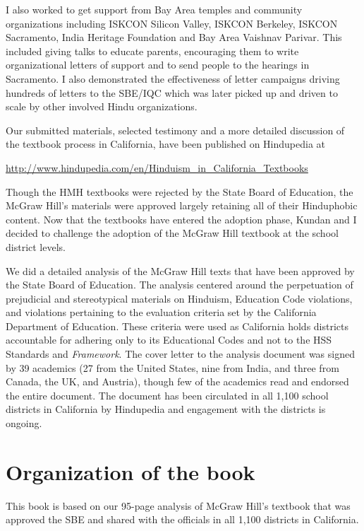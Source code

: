 I also worked to get support from Bay Area temples and community organizations including ISKCON Silicon Valley, ISKCON Berkeley, ISKCON Sacramento, India Heritage Foundation and Bay Area Vaishnav Parivar. This included giving talks to educate parents, encouraging them to write organizational letters of support and to send people to the hearings in Sacramento. I also demonstrated the effectiveness of letter campaigns driving hundreds of letters to the SBE/IQC which was later picked up and driven to scale by other involved Hindu organizations.

Our submitted materials, selected testimony and a more detailed discussion of the textbook process in California, have been published on Hindupedia at 

{\small\url{http://www.hindupedia.com/en/Hinduism_in_California_Textbooks}}

Though the HMH textbooks were rejected by the State Board of Education, the McGraw Hill’s materials were approved largely retaining all of their Hinduphobic content. Now that the textbooks have entered the adoption phase, Kundan and I decided to challenge the adoption of the McGraw Hill textbook at the school district levels. 

We did a detailed analysis of the McGraw Hill texts that have been approved by the State Board of Education. The analysis centered around the perpetuation of prejudicial and stereotypical materials on Hinduism, Education Code violations, and violations pertaining to the evaluation criteria set by the California Department of Education. These criteria were used as California holds districts accountable for adhering only to its Educational Codes and not to the HSS Standards and \textit{Framework}. The cover letter to the analysis document was signed by 39 academics (27 from the United States, nine from India, and three from Canada, the UK, and Austria), though  few of the academics read and endorsed the entire document. The document has been circulated in all 1,100 school districts in California by Hindupedia and engagement with the districts is ongoing.

\section*{Organization of the book}
\vskip -5pt

This book is based on our 95-page analysis of McGraw Hill’s textbook that was approved the SBE and shared with the officials in all 1,100 districts in California. 

